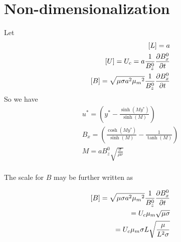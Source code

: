 \documentclass[11pt]{article}
\begin{document}
\section{Non-dimensionalization}
Let
\begin{equation}\begin{aligned}
[L] = a \\
[U] = U_c = a \frac{1}{B_z^0} \frac{\PD B_x^0}{\PD t} \\
[B] = \sqrt{\mu \sigma a^2 \M^2} \frac{1}{B_z^0} \frac{\PD B_x^0}{\PD t}
\end{aligned} \end{equation}
So we have
\begin{equation}\begin{aligned}
u^* = \left( y^* - \frac{\sinh(M y^*)}{\sinh(M)} \right) \\
B_x = \left( \frac{\cosh(M y^*)}{\sinh(M)} - \frac{1}{\tanh(M)} \right) \\
M = a B_z^0 \sqrt{\frac{\sigma}{\rho \nu}} \\
\end{aligned} \end{equation}

The scale for $B$ may be further written as

\begin{equation}\begin{aligned}
[B] = \sqrt{\mu \sigma a^2 \M^2} \frac{1}{B_z^0} \frac{\PD B_x^0}{\PD t} \\
    = U_c \M \sqrt{\mu \sigma} \\
    = U_c \M \sigma L \sqrt{\frac{\mu}{L^2 \sigma} } \\
\end{aligned} \end{equation}

\end{document}
